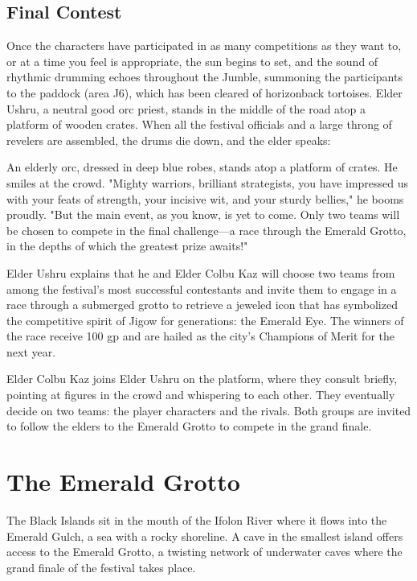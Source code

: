 \documentclass[10pt,a4paper,twoside,twocolumn,openany,nodeprecatedcode]{dndbook}
\begin{document}
\subsection{Final Contest}
Once the characters have participated in as many competitions as they want to, or at a time you feel is appropriate, the sun begins to set, and the sound of rhythmic drumming echoes throughout the Jumble, summoning the participants to the paddock (area J6), which has been cleared of horizonback tortoises. Elder Ushru, a neutral good orc priest, stands in the middle of the road atop a platform of wooden crates. When all the festival officials and a large throng of revelers are assembled, the drums die down, and the elder speaks:

\begin{DndReadAloud}{}
An elderly orc, dressed in deep blue robes, stands atop a platform of crates. He smiles at the crowd. "Mighty warriors, brilliant strategists, you have impressed us with your feats of strength, your incisive wit, and your sturdy bellies," he booms proudly. "But the main event, as you know, is yet to come. Only two teams will be chosen to compete in the final challenge—a race through the Emerald Grotto, in the depths of which the greatest prize awaits!"

\end{DndReadAloud}

Elder Ushru explains that he and Elder Colbu Kaz will choose two teams from among the festival's most successful contestants and invite them to engage in a race through a submerged grotto to retrieve a jeweled icon that has symbolized the competitive spirit of Jigow for generations: the Emerald Eye. The winners of the race receive 100 gp and are hailed as the city's Champions of Merit for the next year.

Elder Colbu Kaz joins Elder Ushru on the platform, where they consult briefly, pointing at figures in the crowd and whispering to each other. They eventually decide on two teams: the player characters and the rivals. Both groups are invited to follow the elders to the Emerald Grotto to compete in the grand finale.

\section{The Emerald Grotto}
The Black Islands sit in the mouth of the Ifolon River where it flows into the Emerald Gulch, a sea with a rocky shoreline. A cave in the smallest island offers access to the Emerald Grotto, a twisting network of underwater caves where the grand finale of the festival takes place.
\end{document}
